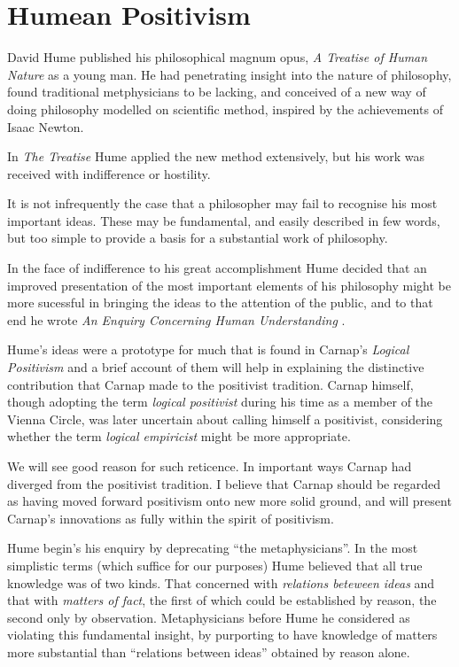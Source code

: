 \section{Humean Positivism}

David Hume published his philosophical magnum opus, \emph{A Treatise of Human Nature} \cite{hume39}
as a young man.
He had penetrating insight into the nature of philosophy, found traditional metphysicians to
be lacking, and conceived of a new way of doing philosophy modelled on scientific method, inspired by the achievements of Isaac Newton.

In \emph{The Treatise} Hume applied the new method extensively, but his work
was received with indifference or hostility.

It is not infrequently the case that a philosopher may fail to recognise
his most important ideas.
These may be fundamental, and easily described in few words, but too simple
to provide a basis for a substantial work of philosophy.

In the face of indifference to his great accomplishment Hume decided that
an improved presentation of the most important elements of his philosophy
might be more sucessful in bringing the ideas to the attention of the
public, and to that end he wrote \emph{An Enquiry Concerning Human Understanding} \cite{hume48}.

Hume's ideas were a prototype for much that is found in Carnap's
\emph{Logical Positivism} and a brief account of them will help in explaining the distinctive
contribution that Carnap made to the positivist tradition.
Carnap himself, though adopting the term \emph{logical positivist} during his time as
a member of the Vienna Circle, was later uncertain about calling himself a positivist,
considering whether the term \emph{logical empiricist} might be more appropriate.

We will see good reason for such reticence.
In important ways Carnap had diverged from the positivist tradition.
I believe that Carnap should be regarded as having moved forward positivism onto new more solid ground, and will present Carnap's innovations as fully within the spirit of positivism.

Hume begin's his enquiry by deprecating ``the metaphysicians''.
In the most simplistic terms (which suffice for our purposes) Hume believed that all true knowledge was of two kinds.
That concerned with {\it relations beteween ideas} and that with {\it matters of fact}, the first of which could be established by reason, the second only by observation.
Metaphysicians before Hume he considered as violating this fundamental insight, by purporting to have knowledge of matters more substantial than ``relations between ideas'' obtained by reason alone.


